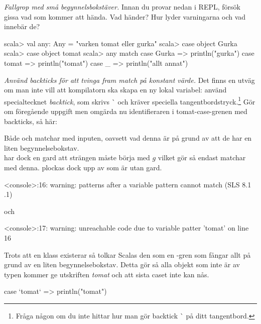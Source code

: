 \Subtask \emph{Fallgrop med små begynnelsbokstäver.} Innan du provar nedan i REPL, försök gissa vad som kommer att hända. Vad händer? Hur lyder varningarna och vad innebär de?
\begin{REPL}
scala> val any: Any = "varken tomat eller gurka"
scala> case object Gurka
scala> case object tomat
scala> any match
         case Gurka => println("gurka")
         case tomat => println("tomat")
         case _ => println("allt annat")
\end{REPL}

\Subtask \emph{Använd backticks för att tvinga fram match på konstant värde.} Det finns en utväg om man inte vill att kompilatorn ska skapa en ny lokal variabel: använd specialtecknet \emph{backtick}, som skrivs \`{} och kräver speciella tangentbordstryck.\footnote{Fråga någon om du inte hittar hur man gör backtick \`{} på ditt tangentbord.}  Gör om föregående uppgift men omgärda nu identifieraren  i tomat-case-grenen med backticks, så här: 



\SOLUTION


\TaskSolved \what


\SubtaskSolved  Både  och  matchar med inputen, oavsett vad denna är på grund av att de har en liten begynnelsebokstav.\\
  har dock en gard att strängen måste börja med $g$ vilket gör så endast  matchar med denna.  plockas dock upp av  som är utan gard.

\SubtaskSolved
\begin{REPL}
<console>:16: warning: patterns after a variable pattern cannot match (SLS 8.1
.1)
\end{REPL}
och
\begin{REPL}
<console>:17: warning: unreachable code due to variable patter 'tomat' on line
16
\end{REPL}
Trots att en klass  existerar så tolkar Scalas  den som en -gren som fångar allt på grund av en liten begynnelsebokstav. Detta gör så alla objekt som inte är av typen  kommer ge utskriften \textit{tomat} och att sista caset inte kan nås.

\SubtaskSolved
\begin{Code}
case `tomat` => println("tomat")
\end{Code}



